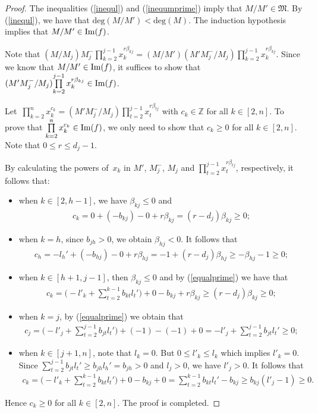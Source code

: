 \documentclass[pdftex]{sigma}
\numberwithin{equation}{section}
\begin{document}
\begin{proof}
The inequalities (\ref{inequl}) and (\ref{inequmprime}) imply that $M/M'\in\mathfrak{M}$. By (\ref{inequl}), we have that $\text{deg}(M/M')<\text{deg}(M)$. The induction hypothesis implies that $M/M'\in\mathop{\rm Im}(f)$.

Note that $(M/M_j)M_{j}^{-}\!\prod\limits_{k=2}^{j-1}\!x_{k}^{r\beta_{kj}}=(M/M')(M'M_{j}^{-}/M_j) \prod\limits_{k=2}^{j-1}\!x_{k}^{r\beta_{kj}}.$
Since we know that \mbox{$M/M'\in\mathop{\rm Im}(f)$}, it suffices to show that$(M'M_{j}^{-}/M_j) \!\prod\limits_{k=2}^{j-1}x_{k}^{r\beta_{kj}}\in\mathop{\rm Im}(f)$.

Let~$\prod\limits_{k=2}^{n}x_{k}^{c_k}=(M'M_{j}^{-}/M_j) \prod\limits_{t=2}^{j-1}x_{t}^{r\beta_{tj}}$ with $ c_k \in \mathbb{Z}$ for all $k \in [2,n]$. To prove that $\prod\limits_{k=2}^{n}x_{k}^{c_k}\in\mathop{\rm Im}(f)$, we only need to show that $c_k\geq0$ for all $k\in[2,n]$. Note that $0\leq r\leq d_{j}-1$.

By calculating the powers of~$x_k$ in $M'$, $M_{j}^{-}$, $M_j$ and $\prod\limits_{t=2}^{j-1}x_{t}^{r\beta_{tj}}$, respectively, it follows that:
\begin{itemize}\itemsep=0pt
 \item[(1)] when $k\in[2,h-1]$, we have $\beta_{kj}\leq0$ and
 \begin{gather*}
 c_k=0+(-b_{kj})-0+r\beta_{kj}=(r-d_{j})\beta_{kj}\geq 0;
 \end{gather*}
 \item[(2)] when $k=h$, since $b_{jh}>0$, we obtain $\beta_{hj}<0$. It follows that
 \begin{gather*}
 c_h=-l_{h}'+(-b_{hj})-0+r\beta_{hj}=-1+(r-d_{j})\beta_{hj}\geq -\beta_{hj}-1\geq0;
 \end{gather*}
 \item[(3)] when $k\in[h+1,j-1]$, then $\beta_{kj}\leq0$ and by (\ref{equalprime}) we have that
 \begin{gather*}
 c_k=\Bigg(-l'_k +\sum\limits_{t=2}^{k-1}b_{kt}l_{t}'\Bigg)+0-b_{kj}+r\beta_{kj} \geq(r-d_{j})\beta_{kj} \geq0;
 \end{gather*}
 \item[(4)] when $k=j$, by (\ref{equalprime}) we obtain that
 \begin{gather*}
 c_j=\Bigg(-l'_j +\sum\limits_{t=2}^{j-1}b_{jt}l_{t}'\Bigg)+(-1)-(-1)+0= -l'_j +\sum\limits_{t=2}^{j-1}b_{jt}l_{t}'\geq0;
 \end{gather*}
 \item[(5)] when $k\in[j+1,n]$, note that $l_k=0$. But $0\leq l'_k\leq l_k$ which implies $l'_k=0$. Since $\sum\limits_{t=2}^{j-1}b_{jt}l_{t}'\geq b_{jh}l_{h}'= b_{jh}>0$ and $l_j>0$, we have $l'_j>0$. It follows that
 \begin{gather*}
c_k=\Bigg(-l'_k +\sum\limits_{t=2}^{k-1}b_{kt}l_{t}'\Bigg)+0-b_{kj}+0= \sum\limits_{t=2}^{k-1}b_{kt}l_{t}' -b_{kj}\geq b_{kj}(l'_j-1)\geq0.
 \end{gather*}
\end{itemize}
Hence $c_k\geq0$ for all $k\in[2,n]$. The proof is completed.
\end{proof}
\end{document}
